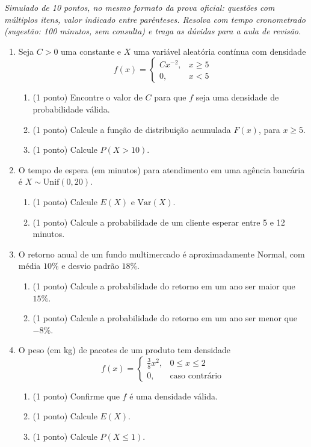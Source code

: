 \documentclass[11pt]{article}
\begin{document}

\noindent \textit{Simulado de 10 pontos, no mesmo formato da prova oficial: questões com múltiplos
itens, valor indicado entre parênteses. Resolva com tempo cronometrado (sugestão: 100 minutos,
sem consulta) e traga as dúvidas para a aula de revisão.}

\begin{enumerate}

\item Seja $C>0$ uma constante e $X$ uma variável aleatória contínua com densidade
$$
f(x) = \begin{cases} Cx^{-2}, & x\ge 5 \\ 0, & x<5 \end{cases}
$$
\begin{enumerate}
  \item (1 ponto) Encontre o valor de $C$ para que $f$ seja uma densidade de probabilidade válida.
  \item (1 ponto) Calcule a função de distribuição acumulada $F(x)$, para $x\ge5$.
  \item (1 ponto) Calcule $P(X>10)$.
\end{enumerate}

\item O tempo de espera (em minutos) para atendimento em uma agência bancária é
$X\sim\text{Unif}(0,20)$.
\begin{enumerate}
  \item (1 ponto) Calcule $E(X)$ e $\mathrm{Var}(X)$.
  \item (1 ponto) Calcule a probabilidade de um cliente esperar entre 5 e 12 minutos.
\end{enumerate}

\item O retorno anual de um fundo multimercado é aproximadamente Normal, com média $10\%$ e
desvio padrão $18\%$.
\begin{enumerate}
  \item (1 ponto) Calcule a probabilidade do retorno em um ano ser maior que $15\%$.
  \item (1 ponto) Calcule a probabilidade do retorno em um ano ser menor que $-8\%$.
\end{enumerate}

\item O peso (em kg) de pacotes de um produto tem densidade
$$
f(x) = \begin{cases} \frac{3}{8}x^2, & 0\le x\le 2 \\ 0, & \text{caso contrário} \end{cases}
$$
\begin{enumerate}
  \item (1 ponto) Confirme que $f$ é uma densidade válida.
  \item (1 ponto) Calcule $E(X)$.
  \item (1 ponto) Calcule $P(X\le 1)$.
\end{enumerate}

\end{enumerate}
\end{document}
